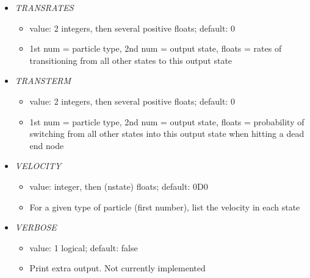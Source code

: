 \documentclass[12pt]{article}
\begin{document}
\begin{itemize}
\item {\it TRANSRATES}
\begin{itemize}
	\item value: 2 integers, then several positive floats; default: 0
	\item 1st num = particle type, 2nd num = output state, floats = rates of transitioning from all other states to this output state
\end{itemize}
\item {\it TRANSTERM}
\begin{itemize}
	\item value: 2 integers, then several positive floats; default: 0
	\item 1st num = particle type, 2nd num = output state, floats = probability of switching from all other states into this output state when hitting a dead end node
\end{itemize}
%
\item {\it VELOCITY}
\begin{itemize}
	\item  value: integer, then (nstate) floats; default: 0D0
	\item For a given type of particle (first number), list the velocity in each state
\end{itemize}
\item {\it VERBOSE}
        \begin{itemize}
          \item  value: 1 logical; default: false
          \item Print extra output. Not currently implemented
        \end{itemize}

\end{itemize}

%
%
\end{document}
